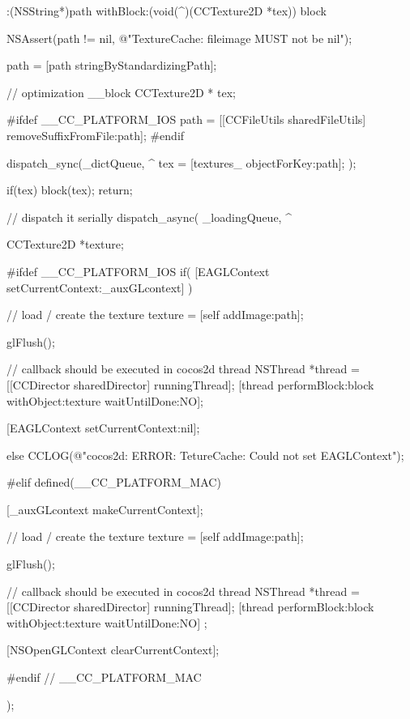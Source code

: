 \begin{DoxyCode}
                     :(NSString*)path withBlock:(void(^)(CCTexture2D *tex))
      block
{
        NSAssert(path != nil, @"TextureCache: fileimage MUST not be nil");

        path = [path stringByStandardizingPath];

        // optimization
        __block CCTexture2D * tex;

#ifdef __CC_PLATFORM_IOS
        path = [[CCFileUtils sharedFileUtils] removeSuffixFromFile:path];
#endif

        dispatch_sync(_dictQueue, ^{
                tex = [textures_ objectForKey:path];
        });

        if(tex) {
                block(tex);
                return;
        }

        // dispatch it serially
        dispatch_async( _loadingQueue, ^{

                CCTexture2D *texture;

#ifdef __CC_PLATFORM_IOS
                if( [EAGLContext setCurrentContext:_auxGLcontext] ) {

                        // load / create the texture
                        texture = [self addImage:path];

                        glFlush();

                        // callback should be executed in cocos2d thread
                        NSThread *thread = [[CCDirector sharedDirector] 
      runningThread];
                        [thread performBlock:block withObject:texture 
      waitUntilDone:NO];

                        [EAGLContext setCurrentContext:nil];
                } else {
                        CCLOG(@"cocos2d: ERROR: TetureCache: Could not set
       EAGLContext");
                }

#elif defined(__CC_PLATFORM_MAC)

                [_auxGLcontext makeCurrentContext];

                // load / create the texture
                texture = [self addImage:path];

                glFlush();

                // callback should be executed in cocos2d thread
                NSThread *thread = [[CCDirector sharedDirector] runningThread];
                [thread performBlock:block withObject:texture waitUntilDone:NO]
      ;

                [NSOpenGLContext clearCurrentContext];

#endif // __CC_PLATFORM_MAC

        });
}
\end{DoxyCode}
